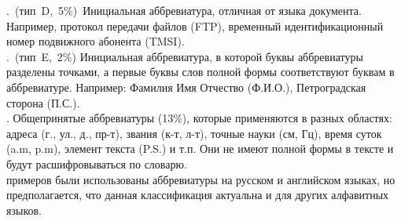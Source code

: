 \documentclass[a4paper, 12pt]{article}
\begin{document}
. (тип D, 5\%) Инициальная аббревиатура, отличная от языка документа. Например, протокол передачи файлов (FTP), временный идентификационный номер подвижного абонента (TMSI).\\
. (тип E, 2\%) Инициальная аббревиатура, в которой буквы аббревиатуры разделены точками, а первые буквы слов полной формы соответствуют буквам в аббревиатуре. Например: Фамилия Имя Отчество (Ф.И.О.), Петроградская сторона (П.С.).\\
. Общепринятые аббревиатуры (13\%), которые применяются в разных областях: адреса (г., ул., д., пр-т), звания (к-т, л-т), точные науки (см, Гц), время суток (a.m, p.m), элемент текста (P.S.) и т.п. Они не имеют полной формы в тексте и будут расшифровываться по словарю.\\
 примеров были использованы аббревиатуры на русском и английском языках, но предполагается, что данная классификация актуальна и для других алфавитных языков.\\
\end{document}
